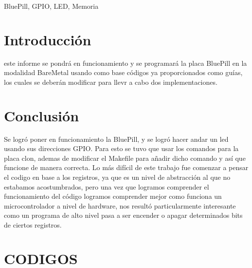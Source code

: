 \documentclass{plantilla}
\begin{document}
\maketitle

\begin{abstract}
En este informe se abordará el desarrollo del trabajo práctico Nro 1, donde se pondrá en funcionamiento y se programará la BluePill para luego hacerla andar con un led usando sus direcciones GPIO.
\end{abstract}

\begin{IEEEkeywords}
BluePill, GPIO, LED, Memoria
\end{IEEEkeywords}

\section{Introducción}
 este informe se pondrá en funcionamiento y se programará la placa BluePill en la modalidad BareMetal usando como base códigos ya proporcionados como guías, los cuales se deberán modificar para llevr a cabo dos implementaciones.







\section{Conclusión}
Se logró poner en funcionamiento la BluePill, y se logró hacer andar un led usando sus direcciones GPIO. Para esto se tuvo que usar los comandos para la placa clon, ademas de modificar el Makefile para añadir dicho comando y así que funcione de manera correcta. Lo más difícil de este trabajo fue comenzar a pensar el codigo en base a los registros, ya que es un nivel de abstracción al que no estabamos acostumbrados, pero una vez que logramos comprender el funcionamiento del código logramos comprender mejor como funciona un microcontrolador a nivel de hardware, nos resultó particularmente interesante como un programa de alto nivel pasa a ser encender o apagar determinados bits de ciertos registros. 
\section{CODIGOS}


\end{document}
